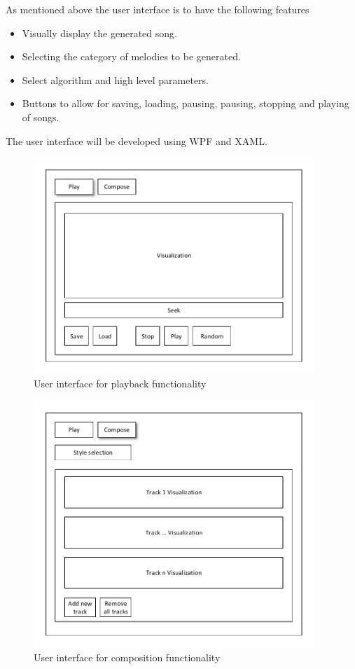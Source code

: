 As mentioned above the user interface is to have the following features
\begin{itemize}
\item Visually display the generated song.
\item Selecting the category of melodies to be generated.
\item Select algorithm and high level parameters.
\item Buttons to allow for saving, loading, pausing, pausing, stopping and playing of songs.
\end{itemize}

The user interface will be developed using \ac{WPF} and \ac{XAML}.

\begin{figure}
\centerline{\includegraphics[width=400px]{../images/ui_play.pdf}}
\caption{User interface for playback functionality}
\label{ims:uiplay}
\end{figure}

\begin{figure}
\centerline{\includegraphics[width=400px]{../images/ui_compose.pdf}}
\caption{User interface for composition functionality}
\label{ims:uicompose}
\end{figure}


